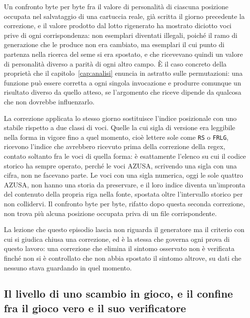 Un confronto byte per byte fra il valore di personalità di ciascuna posizione occupata nel salvataggio di una cartuccia reale, già scritta il giorno precedente la correzione, e il valore prodotto dal lotto rigenerato ha mostrato diciotto voci prive di ogni corrispondenza: non esemplari diventati illegali, poiché il ramo di generazione che le produce non era cambiato, ma esemplari il cui punto di partenza nella ricerca del seme si era spostato, e che ricevevano quindi un valore di personalità diverso a parità di ogni altro campo. È il caso concreto della proprietà che il capitolo~\ref{cap:analisi} enuncia in astratto sulle permutazioni: una funzione può essere corretta a ogni singola invocazione e produrre comunque un risultato diverso da quello atteso, se l'argomento che riceve dipende da qualcosa che non dovrebbe influenzarlo.

La correzione applicata lo stesso giorno sostituisce l'indice posizionale con uno stabile rispetto a due classi di voci. Quelle la cui sigla di versione era leggibile nella forma in vigore fino a quel momento, cioè lettere sole come \texttt{RS} o \texttt{FRLG}, ricevono l'indice che avrebbero ricevuto prima della correzione della regex, contato soltanto fra le voci di quella forma: è esattamente l'elenco su cui il codice storico ha sempre operato, perché le voci AZUSA, scrivendo una sigla con una cifra, non ne facevano parte. Le voci con una sigla numerica, oggi le sole quattro AZUSA, non hanno una storia da preservare, e il loro indice diventa un'impronta del contenuto della propria riga nella fonte, spostata oltre l'intervallo storico per non collidervi. Il confronto byte per byte, rifatto dopo questa seconda correzione, non trova più alcuna posizione occupata priva di un file corrispondente.

La lezione che questo episodio lascia non riguarda il generatore ma il criterio con cui si giudica chiusa una correzione, ed è la stessa che governa ogni prova di questo lavoro: una correzione che elimina il sintomo osservato non è verificata finché non si è controllato che non abbia spostato il sintomo altrove, su dati che nessuno stava guardando in quel momento.

\subsection{Il livello di uno scambio in gioco, e il confine fra il gioco vero e il suo verificatore}

